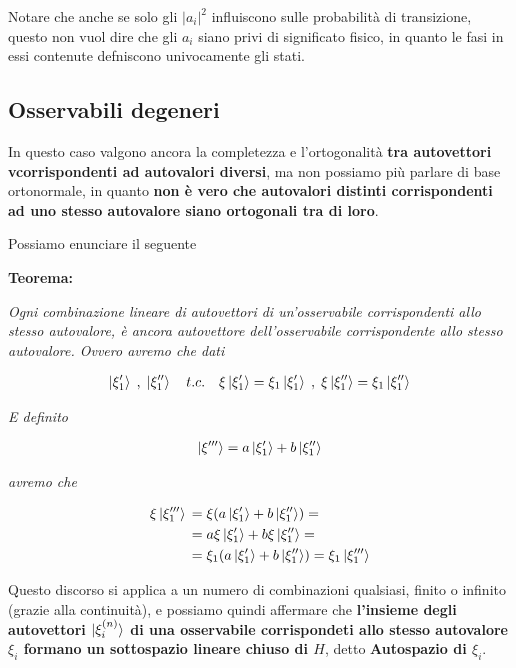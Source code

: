 Notare che anche se solo gli $|a_i|^2$ influiscono sulle probabilità di transizione, questo non vuol dire che gli $a_i$ siano privi di significato fisico, in quanto le fasi in essi contenute defniscono univocamente gli stati.
	
	
\subsection{Osservabili degeneri}

In questo caso valgono ancora la completezza e l'ortogonalità \textbf{tra autovettori vcorrispondenti ad autovalori diversi}, ma non possiamo più parlare di base ortonormale, in quanto \textbf{non è vero che autovalori distinti corrispondenti ad uno stesso autovalore siano ortogonali tra di loro}.

Possiamo enunciare il seguente 

\bigskip

\textbf{Teorema:}

\textit{Ogni combinazione lineare di autovettori di un'osservabile corrispondenti allo stesso autovalore, è ancora autovettore dell'osservabile corrispondente allo stesso autovalore. Ovvero avremo che dati}

\begin{align}
\ket{\xi'_1} \;,\; \ket{\xi''_1} \quad t.c. \quad \xi\ket{\xi'_1}=\xi_1\ket{\xi'_1} \;,\; \xi\ket{\xi''_1}=\xi_1\ket{\xi''_1}
\end{align}

\textit{E definito}

\begin{align}
\ket{\xi'''}= a\ket{\xi'_1} + b\ket{\xi''_1}
\end{align}

\textit{avremo che}

\begin{align}
\xi\ket{\xi'''_1} {}&= \xi(a\ket{\xi'_1} + b\ket{\xi''_1})= \nonumber \\
&= a\xi\ket{\xi'_1} + b\xi\ket{\xi''_1}= \nonumber \\
&=\xi_1(a\ket{\xi'_1} + b\ket{\xi''_1}) = \xi_1 \ket{\xi'''_1}
\end{align}


\bigskip

Questo discorso si applica a un numero di combinazioni qualsiasi, finito o infinito (grazie alla continuità), e possiamo quindi affermare che \textbf{l'insieme degli autovettori $\ket{\xi^{(n)}_i}$ di una osservabile corrispondeti allo stesso autovalore $\xi_i$ formano un sottospazio lineare chiuso di $H$}, detto \textbf{Autospazio di $\xi_i$}.

